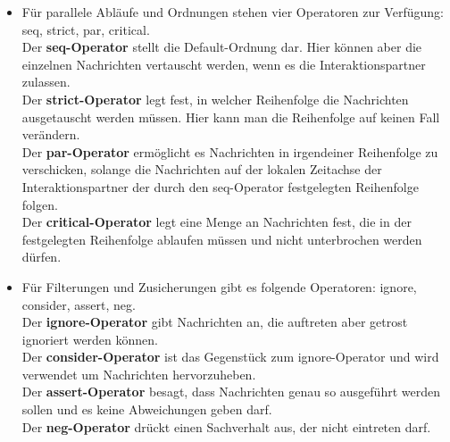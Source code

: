 \documentclass[a4paper, 12pt, margins=2.5cm]{homework}
\begin{document}
\begin{solution}
\begin{itemize}
      \item Für parallele Abläufe und Ordnungen stehen vier Operatoren zur Verfügung:
            seq, strict, par, critical. \\
            Der \textbf{seq-Operator} stellt die Default-Ordnung dar. Hier können
            aber die einzelnen Nachrichten vertauscht werden, wenn es die Interaktionspartner
            zulassen. \\
            Der \textbf{strict-Operator} legt fest, in welcher Reihenfolge die Nachrichten
            ausgetauscht werden müssen. Hier kann man die Reihenfolge auf keinen
            Fall verändern. \\
            Der \textbf{par-Operator} ermöglicht es Nachrichten in irgendeiner
            Reihenfolge zu verschicken, solange die Nachrichten auf der lokalen
            Zeitachse der Interaktionspartner der durch den seq-Operator festgelegten
            Reihenfolge folgen. \\
            Der \textbf{critical-Operator} legt eine Menge an Nachrichten fest,
            die in der festgelegten Reihenfolge ablaufen müssen und nicht unterbrochen
            werden dürfen. 

      \item Für Filterungen und Zusicherungen gibt es folgende Operatoren:
            ignore, consider, assert, neg. \\
            Der \textbf{ignore-Operator} gibt Nachrichten an, die auftreten
            aber getrost ignoriert werden können. \\
            Der \textbf{consider-Operator} ist das Gegenstück zum ignore-Operator
            und wird verwendet um Nachrichten hervorzuheben. \\
            Der \textbf{assert-Operator} besagt, dass Nachrichten genau so ausgeführt
            werden sollen und es keine Abweichungen geben darf. \\
            Der \textbf{neg-Operator} drückt einen Sachverhalt aus, der nicht 
            eintreten darf. 
    \end{itemize}
  \end{solution}


  \begin{problem}
    
  \end{problem}
  \begin{solution}\hfill
    \begin{center}
      \def\svgwidth{1\textwidth}  
    \end{center}
  \end{solution}
\end{document}
